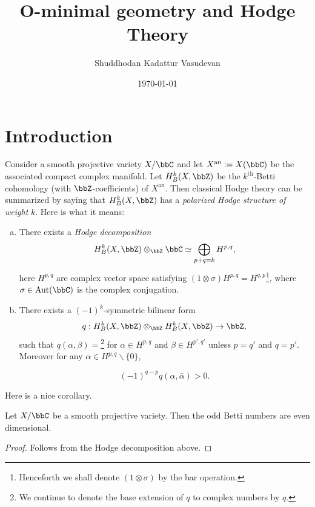 \documentclass[a4paper,12pt]{book}
\title{O-minimal geometry and Hodge Theory}
\author{Shuddhodan Kadattur Vasudevan}
\date{\today}
\begin{document}
\maketitle


\chapter{Introduction}
\label{chap:intro}

Consider a smooth projective variety $X/\bbC$ and let $X^{\mathrm{an}}:=X(\bbC)$ be the associated compact complex manifold. Let $H^{k}_{B}(X,\bbZ)$ be the $k^{\mathrm{th}}$-Betti cohomology (with $\bbZ$-coefficients) of $X^{\mathrm{an}}$. Then classical Hodge theory  
can be summarized by saying that $H^{k}_{B}(X,\bbZ)$ has a \textit{polarized Hodge structure of weight} $k$. Here is what it means:

\begin{enumerate}[(a)]
\item There exists a \textit{Hodge decomposition}
\[
H^{k}_{B}(X,\bbZ) \otimes_{\bbZ} \bbC \simeq \bigoplus_{p+q=k}H^{p,q},
\]
\noindent here $H^{p,q}$ are complex vector space satisfying $(1 \otimes \sigma)H^{p,q}=H^{q,p}$\footnote{Henceforth we shall denote $(1 \otimes \sigma)$ by the bar operation.}, where $\sigma \in \text{Aut}(\bbC)$ is the complex conjugation.  

\item There exists a $(-1)^{k}$-symmetric bilinear form 
\[
q : H^{k}_{B}(X,\bbZ) \otimes_{\bbZ}H^{k}_{B}(X,\bbZ) \to \bbZ,
\]
\noindent such that $q(\alpha,\beta)=$\footnote{We continue to denote the base extension of $q$ to complex numbers by $q$.} for $\alpha \in H^{p,q}$ and $\beta \in H^{p',q'}$ unless $p=q'$ and $q=p'$. Moreover for any $\alpha \in H^{p,q}\backslash \{0\}$,

\[
(-1)^{q-p}q(\alpha,\bar{\alpha}) >0.
\] 
\end{enumerate}

Here is a nice corollary.

\begin{cor}\label{cor:odd-betti-even}
Let $X/\bbC$ be a smooth projective variety. Then the odd Betti numbers are even dimensional.
\end{cor}

\begin{proof}
Follows from the Hodge decomposition above. 
\end{proof}
\end{document}
